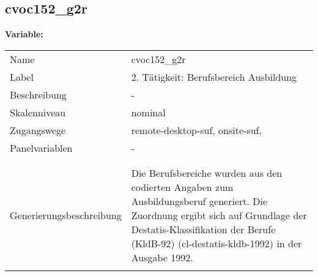 	
	
	\subsection{cvoc152\_g2r}
	\label{subSection:cvoc152_g2r}

	\noindent\textbf{Variable:}\\
		\begin{tabular}{lL{11.3cm}}
			\label{tableVariable:cvoc152_g2r}
			Name & cvoc152\_g2r \\
			Label & 2. Tätigkeit: Berufsbereich Ausbildung \\
			Beschreibung & - \\
			Skalenniveau & nominal \\
			Zugangswege &
				remote-desktop-suf,
				onsite-suf,
 \\
			Panelvariablen & -
			 \\
			 \\
 \\
					Generierungsbeschreibung & Die Berufsbereiche wurden aus den codierten Angaben zum Ausbildungsberuf generiert. Die Zuordnung ergibt sich auf Grundlage der Destatis-Klassifikation der Berufe (KldB-92) (cl-destatis-kldb-1992) in der Ausgabe 1992. 
				 \\	
			 \\
		\end{tabular}







